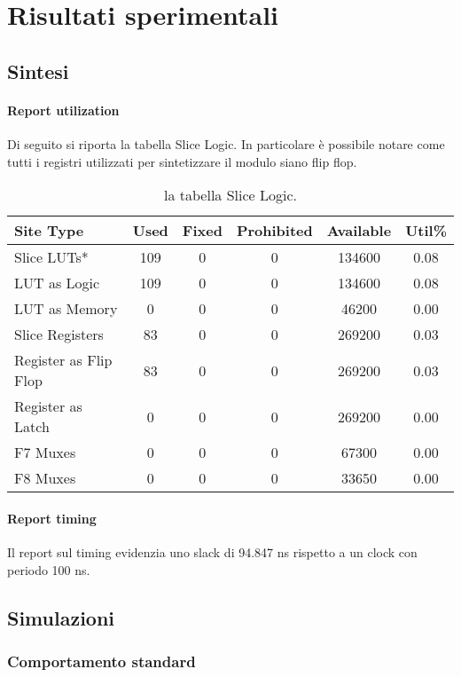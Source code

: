 \documentclass{article}
\begin{document}
	\newpage

	\section{Risultati sperimentali}

		\subsection{Sintesi}
			\paragraph{Report utilization}
			Di seguito si riporta la tabella Slice Logic. In particolare è possibile notare come
			tutti i registri utilizzati per sintetizzare il modulo siano flip flop.

			\begin{table}[H]
				\centering
				\begin{tabular}{ l|c|c|c|c|c }
					Site Type & Used & Fixed & Prohibited & Available & Util\% \\
					\hline
					Slice LUTs* & 109 & 0 & 0 & 134600 & 0.08 \\
					\quad LUT as Logic & 109 & 0 & 0 & 134600 & 0.08 \\
					\quad LUT as Memory & 0 & 0 & 0 & 46200 & 0.00 \\
					Slice Registers & 83 & 0 & 0 & 269200 & 0.03 \\
					\quad Register as Flip Flop & 83 & 0 & 0 & 269200 & 0.03 \\
					\quad Register as Latch & 0 & 0 & 0 & 269200 & 0.00 \\
					F7 Muxes & 0 & 0 & 0 & 67300 & 0.00 \\
					F8 Muxes & 0 & 0 & 0 & 33650 & 0.00 \\
				\end{tabular}
				\caption{la tabella Slice Logic.}
			\end{table}

			\paragraph{Report timing}
			Il report sul timing evidenzia uno slack di 94.847 ns rispetto a un clock con
			periodo 100 ns.

		\subsection{Simulazioni}
			\subsubsection{Comportamento standard}
\end{document}
